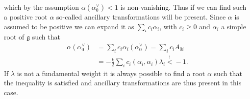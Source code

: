which by the assumption $\alpha(\alpha_0^\vee)<1$ is non-vanishing. Thus if we can find such a positive root $\alpha$ so-called ancillary transformations will be present. Since $\alpha$ is assumed to be positive we can expand it as $\sum_i c_i\alpha_i$, with $c_i\geq 0$ and $\alpha_i$ a simple root of $\mathfrak{g}$ such that
\begin{equation}
    \begin{aligned}
        \alpha(\alpha_0^\vee) &= \sum_i c_i\alpha_i(\alpha_0^\vee) = \sum_i c_i A_{0i}\\ 
        &= -\frac{k}{2}\sum_ic_i(\alpha_i,\alpha_i)\lambda_i\overset{!}{<}-1.
    \end{aligned}
\end{equation}
If $\lambda$ is not a fundamental weight it is always possible to find a root $\alpha$ such that the inequality is satisfied and ancillary transformations are thus present in this case. 

